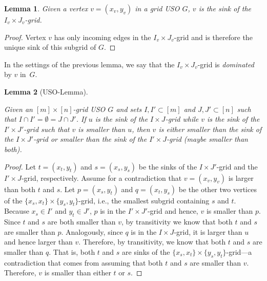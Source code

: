 \documentclass[a4paper,10pt]{article}
\newtheorem{lemma}{Lemma}
\begin{document}
\begin{lemma}\label{lemma:Sink of dominated grid}
Given a vertex  $v = (x_v, y_v)$ in a grid USO $G$, $v$ is the sink of the $I_v\times J_v$-grid.
\end{lemma}
\begin{proof}
Vertex $v$ has only incoming edges in the $I_v\times J_v$-grid and is therefore the unique sink of this subgrid of $G$. 
\end{proof}

In the settings of the previous lemma, we say that the $I_v\times J_v$-grid is \emph{dominated} by $v$ in~$G$.

\begin{lemma}[USO-Lemma]\label{lemma:USO-Lemma}

Given an $[m]\times[n]$-grid USO $G$ and sets $I, I'\subset [m]$ and $J,J'\subset [n]$ such that $I\cap I' = \emptyset = J\cap J'$. If $u$ is the sink of the $I\times J$-grid while $v$ is the sink of the $I'\times J'$-grid such that $v$ is smaller than $u$, then $v$ is either smaller than the sink of the $I\times J'$-grid or smaller than the sink of the $I'\times J$-grid (maybe smaller than both).
\end{lemma}
\begin{proof}
Let $t = (x_t, y_t)$ and $s = (x_s, y_s)$ be the sinks of the $I\times J'$-grid and the $I'\times J$-grid, respectively.
Assume for a contradiction that $v = (x_v, y_v)$ is larger than both $t$ and $s$. 
Let $p = (x_s, y_t)$ and $q = (x_t, y_s)$ be the other two vertices of the $\{x_s, x_t\}\times\{y_s, y_t\}$-grid, i.e., the smallest subgrid containing $s$ and $t$. 
Because $x_s \in I'$ and $y_t\in J'$, $p$ is in the $I'\times J'$-grid and hence, $v$ is smaller than $p$. Since $t$ and $s$ are both smaller than $v$, by transitivity we know that both $t$ and $s$ are smaller than $p$. 
Analogously, since $q$ is in the $I\times J$-grid, it is larger than $u$ and hence larger than $v$. Therefore, by transitivity, we know that both $t$ and $s$ are smaller than $q$. That is, both $t$ and $s$ are sinks of the $\{x_s, x_t\}\times\{y_s, y_t\}$-grid---a contradiction that comes from assuming that both $t$ and $s$ are smaller than $v$.
Therefore, $v$ is smaller than either $t$ or $s$.
\end{proof}
\end{document}
